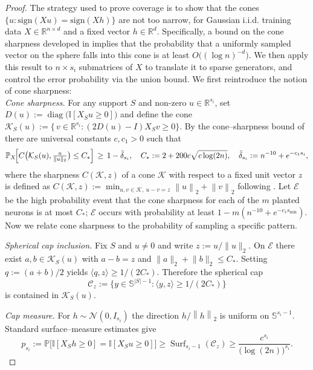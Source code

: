 \documentclass{article} %
\newcommand{\twonorm}[1]{\left\|#1\right\|_{2}}
\newcommand{\n}{\ensuremath{n}}
\newcommand{\X}{\ensuremath{X}}
\newcommand{\h}{\ensuremath{h}}
\newcommand{\Prob}{\ensuremath{{\mathbb{P}}}}
\newcommand{\1}{\ensuremath{{\sf (i)}}}
\newcommand{\2}{\ensuremath{{\sf (ii)}}}
\newcommand{\3}{\ensuremath{{\sf (iii)}}}
\newcommand{\4}{\ensuremath{{\sf (iv)}}}
\newcommand{\5}{\ensuremath{{\sf (v)}}}
\newcommand{\6}{\ensuremath{{\sf (vi)}}}
\newcommand{\R}{\mathbb{R}}
\begin{document}
\begin{proof}
The strategy used to prove coverage is to show that the cones $\{u: \mathrm{sign}(Xu)= \mathrm{sign}(Xh)\}$ are not too narrow, for Gaussian i.i.d. training data $X\in \mathbb{R}^{n \times d}$ and a fixed vector $h \in \mathbb{R}^d$. Specifically, a bound on the cone sharpness developed in \cite{kim2024convex} implies that the probability that a uniformly sampled vector on the sphere falls into this cone is at least $O\big((\log n)^{-d}\big)$. We then apply this result to $n\times s_i$ submatrices of $X$ to translate it to sparse generators, and control the error probability via the union bound. We first reintroduce the notion of cone sharpness:\\
\textit{Cone sharpness.}
For any support \(S\) and non-zero \(u \in \R^{s_i}\), set
\(
D(u) := \operatorname{diag}\bigl(\mathbb{I}[\X_{S}u \ge 0]\bigr)
\)
and define the cone
\(
\mathcal{K}_{S}(u) := \{\,v \in \R^{s_i} : (2D(u)-I) \X_{S} v \ge 0 \}.
\)
By the cone–sharpness bound of~\cite{kim2024convex} there are universal constants \(c, c_1>0\) such that
\[
\Prob_{\X}\!\Bigl[C\bigl(\mathcal{K}_{S}(u), \tfrac{u}{\lVert u \rVert_{2}}\bigr) \le C_{*}\Bigr]
\,\ge\, 1 - \tilde\delta_{s_i},
\quad
C_{*} := 2 + 200c \sqrt{c \log(2n)},
\quad
\tilde\delta_{s_i} := \n^{-10} + e^{-c_{1} s_i} ,
\]
where the sharpness $C(\mathcal{K},z)$ of a cone $\mathcal{K}$ with respect to a fixed unit vector $z$ is defined as $C(\mathcal{K},z) := \min_{u, v \in \mathcal{K}, ~u-v=z} \twonorm{u} + \twonorm{v} $ following \citet{kim2024convex}. 
Let $\mathcal{E}$ be the high probability event that the cone sharpness for each of the $m$ planted neurons is at most $C_*$; $\mathcal{E}$ occurs with probability at least $1-m(n^{-10} + e^{-c_1s_\text{min}})$. 
Now we relate cone sharpness to the probability of sampling a specific pattern.



\textit{Spherical cap inclusion.}
Fix \(S\) and \(u\neq 0\) and write \(z := u / \lVert u \rVert_{2}\).
On \(\mathcal{E}\) there exist \(a,b \in \mathcal{K}_{S}(u)\) with \(a-b = z\) and
\(\lVert a \rVert_{2} + \lVert b \rVert_{2} \le C_{*}\).
Setting \(q := (a+b)/2\) yields
\(\langle q, z \rangle \ge 1/(2C_{*})\).
Therefore the spherical cap
\[
\mathcal{C}_{z}
:=
\bigl\{
y \in \mathbb{S}^{|S|-1}
      : \langle y, z \rangle \ge 1/(2C_{*})
\bigr\}
\]
is contained in \(\mathcal{K}_{S}(u)\).



\textit{Cap measure.}
For \(\h \sim \mathcal{N}(0, I_{s_i})\) the direction
\(\h / \twonorm{\h}\) is uniform on \(\mathbb{S}^{s_i-1}\).
Standard surface–measure estimates give
\[
p_{s_i}
:=
\Prob\!\bigl[\mathbb{I}[\X_{S} \h \ge 0] = \mathbb{I}[\X_{S} u \ge 0]\bigr]
\ge
\operatorname{Surf}_{s_i-1}(\mathcal{C}_{z})
\ge
\frac{c^{s_i}}{\bigl(\log(2\n)\bigr)^{s_i}}.
\]



\end{proof}
\end{document}

